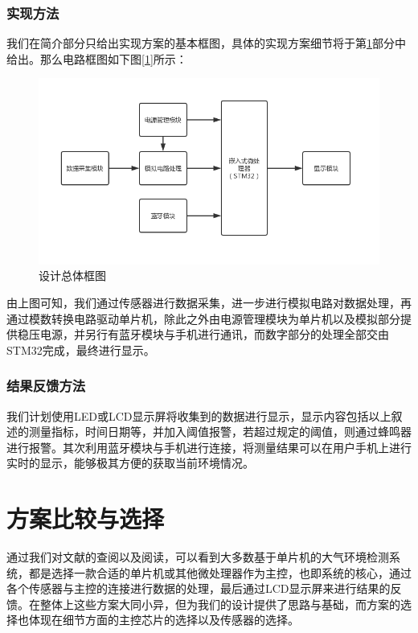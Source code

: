 \documentclass[12pt]{ctexart}
\begin{document}
\subsubsection{实现方法}
\par{} 我们在简介部分只给出实现方案的基本框图，具体的实现方案细节将于第\ref{sect1}部分中给出。那么电路框图如下图[\ref{img1}]所示：
\begin{figure}[H]
    \centering
    \includegraphics[scale = 0.58 ]{1-1.png}
    \caption{设计总体框图}
    \label{img1} 
  \end{figure}
\par{} 由上图可知，我们通过传感器进行数据采集，进一步进行模拟电路对数据处理，再通过模数转换电路驱动单片机，除此之外由电源管理模块为单片机以及模拟部分提供稳压电源，并另行有蓝牙模块与手机进行通讯，而数字部分的处理全部交由STM32完成，最终进行显示。

\subsubsection{结果反馈方法}
\par{} 我们计划使用LED或LCD显示屏将收集到的数据进行显示，显示内容包括以上叙述的测量指标，时间日期等，并加入阈值报警，若超过规定的阈值，则通过蜂鸣器进行报警。其次利用蓝牙模块与手机进行连接，将测量结果可以在用户手机上进行实时的显示，能够极其方便的获取当前环境情况。

\section{方案比较与选择}\label{sect1}
\par{} 通过我们对文献的查阅以及阅读，可以看到大多数基于单片机的大气环境检测系统，都是选择一款合适的单片机或其他微处理器作为主控，也即系统的核心，通过各个传感器与主控的连接进行数据的处理，最后通过LCD显示屏来进行结果的反馈。在整体上这些方案大同小异，但为我们的设计提供了思路与基础，而方案的选择也体现在细节方面的主控芯片的选择以及传感器的选择。
\end{document}
